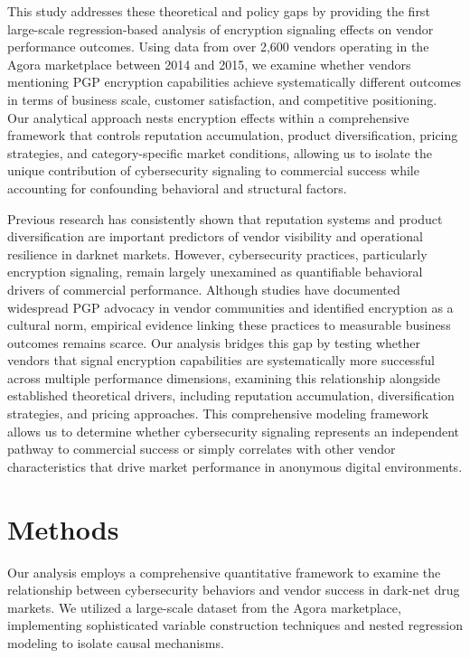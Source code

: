 \documentclass{article}
\begin{document}
This study addresses these theoretical and policy gaps by providing the first large-scale regression-based analysis of encryption signaling effects on vendor performance outcomes. Using data from over 2,600 vendors operating in the Agora marketplace between 2014 and 2015, we examine whether vendors mentioning PGP encryption capabilities achieve systematically different outcomes in terms of business scale, customer satisfaction, and competitive positioning. Our analytical approach nests encryption effects within a comprehensive framework that controls reputation accumulation, product diversification, pricing strategies, and category-specific market conditions, allowing us to isolate the unique contribution of cybersecurity signaling to commercial success while accounting for confounding behavioral and structural factors.

Previous research has consistently shown that reputation systems and product diversification are important predictors of vendor visibility and operational resilience in darknet markets. However, cybersecurity practices, particularly encryption signaling, remain largely unexamined as quantifiable behavioral drivers of commercial performance. Although studies have documented widespread PGP advocacy in vendor communities and identified encryption as a cultural norm, empirical evidence linking these practices to measurable business outcomes remains scarce. Our analysis bridges this gap by testing whether vendors that signal encryption capabilities are systematically more successful across multiple performance dimensions, examining this relationship alongside established theoretical drivers, including reputation accumulation, diversification strategies, and pricing approaches. This comprehensive modeling framework allows us to determine whether cybersecurity signaling represents an independent pathway to commercial success or simply correlates with other vendor characteristics that drive market performance in anonymous digital environments.
\section{Methods}
\label{sec:methods}

Our analysis employs a comprehensive quantitative framework to examine the relationship between cybersecurity behaviors and vendor success in dark-net drug markets. We utilized a large-scale dataset from the Agora marketplace, implementing sophisticated variable construction techniques and nested regression modeling to isolate causal mechanisms.
\end{document}
